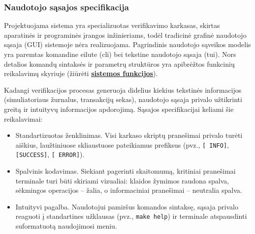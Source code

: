 
\subsubsection{Naudotojo sąsajos specifikacija}

Projektuojama sistema yra specializuotas verifikavimo karkasas, skirtas aparatinės ir programinės įrangos inžinieriams, todėl tradicinė grafinė naudotojo sąsaja (GUI) sistemoje nėra realizuojama. Pagrindinis naudotojo sąveikos modelis yra paremtas komandine eilute (\gls{cli}) bei tekstine naudotojo sąsaja (\gls{tui}). Nors detalios komandų sintaksės ir parametrų struktūros yra apibrėžtos funkcinių reikalavimų skyriuje (žiūrėti \hyperref[section:sistemos-funkcijos]{\textbf{sistemos funkcijos}}).

Kadangi verifikacijos procesas generuoja didelius kiekius tekstinės informacijos (simuliatoriaus žurnalus, transakcijų sekas), naudotojo sąsaja privalo užtikrinti greitą ir intuityvų informacijos apdorojimą. Sąsajos specifikacijai keliami šie reikalavimai:
\begin{itemize}
	\item Standartizuotas ženklinimas. Visi karkaso skriptų pranešimai privalo turėti aiškius, laužtiniuose skliaustuose pateikiamus prefiksus (pvz., \texttt{[   INFO]}, \texttt{[SUCCESS]}, \texttt{[  ERROR]}).
	\item Spalvinis kodavimas. Siekiant pagerinti skaitomumą, kritiniai pranešimai terminale turi būti skiriami vizualiai: klaidos žymimos raudona spalva, sėkmingos operacijos -- žalia, o informaciniai pranešimai -- neutralia spalva.
	\item Intuityvi pagalba. Naudotojui pamiršus komandos sintaksę, sąsaja privalo reaguoti į standartines užklausas (pvz., \texttt{make help}) ir terminale atspausdinti suformatuotą naudojimosi meniu.
\end{itemize}

